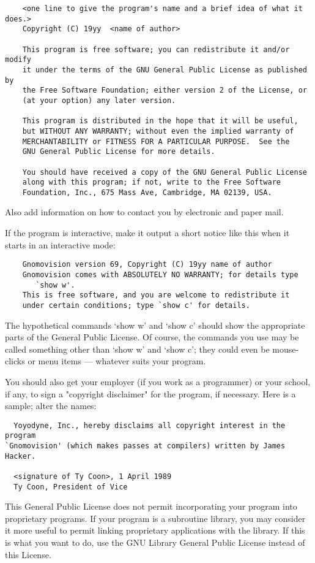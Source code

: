 {\begin{verbatim}
    <one line to give the program's name and a brief idea of what it does.>
    Copyright (C) 19yy  <name of author>

    This program is free software; you can redistribute it and/or modify
    it under the terms of the GNU General Public License as published by
    the Free Software Foundation; either version 2 of the License, or
    (at your option) any later version.

    This program is distributed in the hope that it will be useful,
    but WITHOUT ANY WARRANTY; without even the implied warranty of
    MERCHANTABILITY or FITNESS FOR A PARTICULAR PURPOSE.  See the
    GNU General Public License for more details.

    You should have received a copy of the GNU General Public License
    along with this program; if not, write to the Free Software
    Foundation, Inc., 675 Mass Ave, Cambridge, MA 02139, USA.
\end{verbatim}

Also add information on how to contact you by electronic and paper mail.

If the program is interactive, make it output a short notice like this
when it starts in an interactive mode:

\begin{verbatim}
    Gnomovision version 69, Copyright (C) 19yy name of author
    Gnomovision comes with ABSOLUTELY NO WARRANTY; for details type
       `show w'.
    This is free software, and you are welcome to redistribute it
    under certain conditions; type `show c' for details.
\end{verbatim}

The hypothetical commands `show w' and `show c' should show the
appropriate parts of the General Public License.  Of course, the
commands you use may be called something other than `show w' and `show
c'; they could even be mouse-clicks or menu items --- whatever suits
your program.

You should also get your employer (if you work as a programmer) or your
school, if any, to sign a "copyright disclaimer" for the program, if
necessary.  Here is a sample; alter the names:

\begin{verbatim}
  Yoyodyne, Inc., hereby disclaims all copyright interest in the program
`Gnomovision' (which makes passes at compilers) written by James Hacker.

  <signature of Ty Coon>, 1 April 1989
  Ty Coon, President of Vice
\end{verbatim}

This General Public License does not permit incorporating your program
into proprietary programs.  If your program is a subroutine library, you
may consider it more useful to permit linking proprietary applications
with the library.  If this is what you want to do, use the GNU Library
General Public License instead of this License.
}


